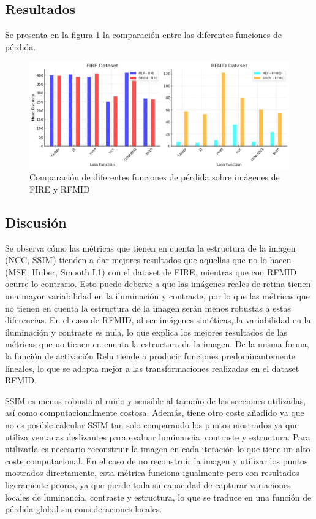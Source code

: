 \subsection{Resultados}
\label{subsec:Resultados-perda}

Se presenta en la figura \ref{fig:loss_functions_comparison} la comparación entre las diferentes funciones de pérdida.

\begin{figure}[tbp]
    \centering
    \includegraphics[width=1\textwidth]{imaxes/losstype.png}
    \caption{Comparación de diferentes funciones de pérdida sobre imágenes de FIRE y RFMID}
    \label{fig:loss_functions_comparison}
\end{figure}

\subsection{Discusión}
\label{subsec:Discusion-loss}

Se observa cómo las métricas que tienen en cuenta la estructura de la imagen (NCC, SSIM) tienden a dar mejores resultados que aquellas que no lo hacen (MSE, Huber, Smooth L1) con el dataset de FIRE, mientras que con RFMID ocurre lo contrario.
Esto puede deberse a que las imágenes reales de retina tienen una mayor variabilidad en la iluminación y contraste, por lo que las métricas que no tienen en cuenta la estructura de la imagen serán menos robustas a estas diferencias.
En el caso de RFMID, al ser imágenes sintéticas, la variabilidad en la iluminación y contraste es nula, lo que explica los mejores resultados de las métricas que no tienen en cuenta la estructura de la imagen.
De la misma forma, la función de activación Relu tiende a producir funciones predominantemente lineales, lo que se adapta mejor a las transformaciones realizadas en el dataset RFMID.

SSIM es menos robusta al ruido y sensible al tamaño de las secciones utilizadas, así como computacionalmente costosa. Además, tiene otro coste añadido ya que no es posible calcular SSIM tan solo comparando los puntos mostrados ya que utiliza ventanas deslizantes para evaluar luminancia, contraste y estructura.
Para utilizarla es necesario reconstruir la imagen en cada iteración lo que tiene un alto coste computacional.
En el caso de no reconstruir la imagen y utilizar los puntos mostrados directamente, esta métrica funciona igualmente pero con resultados ligeramente peores, ya que pierde toda su capacidad de capturar variaciones locales de luminancia, contraste y estructura, lo que se traduce en una función de pérdida global sin consideraciones locales.

